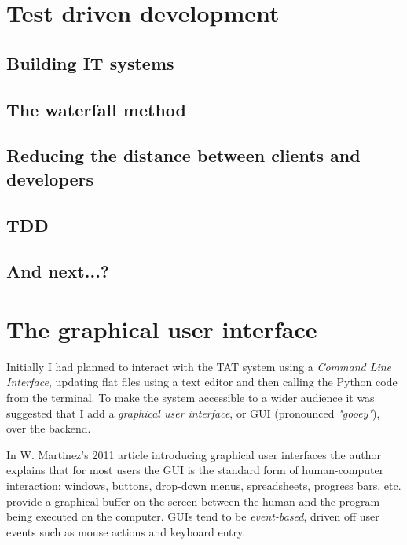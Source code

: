 \documentclass[10pt]{article}
\begin{document}
\section{Test driven development} \label{tdd}

\subsection{Building IT systems}

\subsection{The waterfall method}

\subsection{Reducing the distance between clients and developers}

\subsection{TDD}

\subsection{And next...?}






\section{The graphical user interface} \label{gui}

Initially I had planned to interact with the TAT system using a \emph{Command Line Interface}, updating flat files using a text editor and then calling the Python code from the terminal. To make the system accessible to a wider audience it was suggested that I add a \emph{graphical user interface}, or GUI (pronounced \emph{"gooey"}), over the backend.

In W. Martinez's 2011 article \cite{Mart11} introducing graphical user interfaces the author explains that for most users the GUI is the standard form of human-computer interaction: windows, buttons, drop-down menus, spreadsheets, progress bars, etc. provide a graphical buffer on the screen between the human and the program being executed on the computer. GUIs tend to be \emph{event-based}, driven off user events such as mouse actions and keyboard entry.
\end{document}
